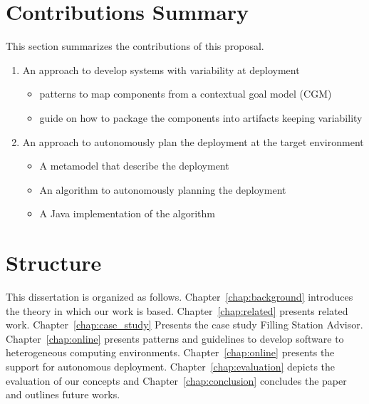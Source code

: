 
\section{Contributions Summary}

This section summarizes the contributions of this proposal.

\begin{enumerate}

\item An approach to develop systems with variability at deployment
\begin{itemize}
  \item patterns to map components from a contextual goal model (CGM)
  \item guide on how to package the components into artifacts keeping variability
\end{itemize}

\item An approach to autonomously plan the deployment at the target environment
\begin{itemize}
  \item A metamodel that describe the deployment
  \item An algorithm to autonomously planning the deployment
  \item A Java implementation of the algorithm
\end{itemize}

\end{enumerate}

\section{Structure}

This dissertation is organized as follows. Chapter~\ref{chap:background} introduces the theory in which our work is based. Chapter~\ref{chap:related} presents related work. Chapter~\ref{chap:case_study} Presents the case study Filling Station Advisor.  Chapter~\ref{chap:online} presents patterns and guidelines to develop software to heterogeneous computing environments. Chapter~\ref{chap:online} presents the support for autonomous deployment.
 Chapter~\ref{chap:evaluation} depicts the evaluation of our concepts and Chapter~\ref{chap:conclusion} concludes the paper and outlines future works.
